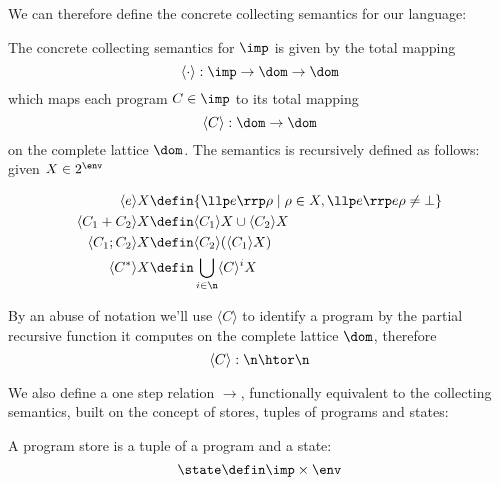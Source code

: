 We can therefore define the concrete collecting semantics for our
language:

\begin{definition}
  The concrete collecting semantics for \(\imp\) is given by the total
  mapping \[\langle \cdot \rangle : \imp \to \dom \to \dom\] which
  maps each program \(C \in \imp\) to its total mapping \[\langle C
  \rangle : \dom \to \dom\] on the complete lattice \(\dom\). The
  semantics is recursively defined as follows: given \(X \in 2^\env\)

  \begin{align*}
    \langle e \rangle X & \defin \{\llp e \rrp \rho \mid \rho \in X,
    \llp e \rrp e \rho \neq \bot\} \\
    \langle C_1 + C_2 \rangle X & \defin \langle C_1 \rangle X \cup
    \langle C_2 \rangle X \\
    \langle C_1 ; C_2 \rangle X & \defin \langle C_2 \rangle (\langle
    C_1 \rangle X) \\
    \langle C^* \rangle X & \defin \bigcup_{i \in \n} \langle C \rangle^i X
  \end{align*}
\end{definition}

\begin{notation}
  By an abuse of notation we'll use \(\langle C \rangle\) to identify
  a program by the partial recursive function it computes on the
  complete lattice \(\dom\), therefore \[\langle C \rangle : \n \htor
  \n\]
\end{notation}

We also define a one step relation \(\to\), functionally equivalent to
the collecting semantics, built on the concept of stores, tuples of
programs and states:

\begin{definition}[Store]
  A program store is a tuple of a program and a state:
  \[\state \defin \imp \times \env\]
\end{definition}


